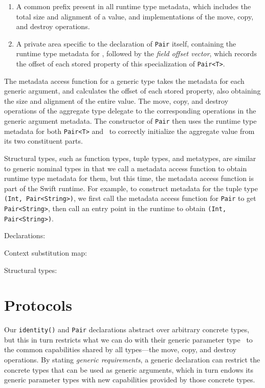 \documentclass[../generics]{subfiles}
\begin{document}
\begin{enumerate}
\item A common prefix present in all runtime type metadata, which includes the total size and alignment of a value, and implementations of the move, copy, and destroy operations.
\item A private area specific to the declaration of \texttt{Pair} itself, containing the runtime type metadata for \tT, followed by the \emph{field offset vector}, which records the offset of each stored property of this specialization of \texttt{Pair<T>}.
\end{enumerate}

The metadata access function for a generic type takes the metadata for each generic argument, and calculates the offset of each stored property, also obtaining the size and alignment of the entire value. The move, copy, and destroy operations of the aggregate type delegate to the corresponding operations in the generic argument metadata. The constructor of \texttt{Pair} then uses the runtime type metadata for both \texttt{Pair<T>} and \tT\ to correctly initialize the aggregate value from its two constituent parts.

Structural types, such as function types, tuple types, and metatypes, are similar to generic nominal types in that we call a metadata access function to obtain runtime type metadata for them, but this time, the metadata access function is part of the Swift runtime. For example, to construct metadata for the tuple type \texttt{(Int, Pair<String>)}, we first call the metadata access function for \texttt{Pair} to get \texttt{Pair<String>}, then call an entry point in the runtime to obtain \texttt{(Int, Pair<String>)}.

\begin{MoreDetails}
\item Declarations: 
\item Context substitution map: 
\item Structural types: 
\end{MoreDetails}

\section{Protocols}\label{intro protocols}

Our \verb|identity()| and \texttt{Pair} declarations abstract over arbitrary concrete types, but this in turn restricts what we can do with their generic parameter type \tT\ to the common capabilities shared by all types---the move, copy, and destroy operations. By stating \emph{generic requirements}, a generic declaration can restrict the concrete types that can be used as generic arguments, which in turn endows its generic parameter types with new capabilities provided by those concrete types.
\end{document}
